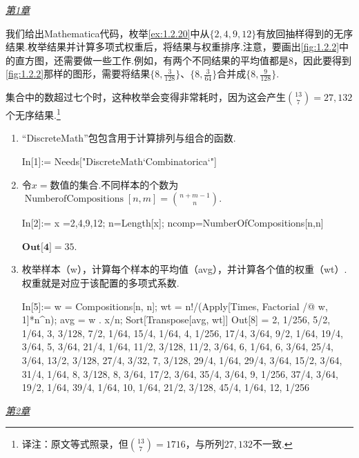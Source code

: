 \medskip\noindent\textit{\hyperref[sec:1]{第1章}}
\begin{example}[无序抽样]\label{ex:12.6.1}
我们给出Mathematica代码，枚举\autoref{ex:1.2.20}中从$\{2,4,9,12\}$有放回抽样得到的无序结果.枚举结果并计算多项式权重后，将结果与权重排序.注意，要画出\autoref{fig:1.2.2}中的直方图，还需要做一些工作.例如，有两个不同结果的平均值都是8，因此要得到\autoref{fig:1.2.2}那样的图形，需要将结果$\{8,\frac{3}{128}\}$、$\{8,\frac{3}{64}\}$合并成$\{8,\frac{9}{128}\}$.

集合中的数超过七个时，这种枚举会变得非常耗时，因为这会产生$\binom{13}{7}=27,132$个无序结果.\footnote{译注：原文等式照录，但$\binom{13}{7}=1716$，与所列$27,132$不一致.}
\begin{enumerate}[label=(\arabic*)]
\item “DiscreteMath”包包含用于计算排列与组合的函数.
\begin{sourcecode}
In[1]:= Needs["DiscreteMath`Combinatorica`"]
\end{sourcecode}
\item 令$x=$数值的集合.不同样本的个数为$\operatorname{NumberofCompositions}[n,m]=\binom{n+m-1}{n}$.
\begin{sourcecode}
In[2]:= x ={2,4,9,12};
n=Length[x];
ncomp=NumberOfCompositions[n,n]
\end{sourcecode}
\noindent$\textbf{Out[4]}=35$.
\item 枚举样本（w），计算每个样本的平均值（avg），并计算各个值的权重（wt）.权重就是对应于该配置的多项式系数.
\begin{sourcecode}
In[5]:= w = Compositions[n, n];
wt = n!/(Apply[Times, Factorial /@ w, 1]*n^n);
avg = w . x/n;
Sort[Transpose[{avg, wt}]]
Out[8] = {2, 1/256}, {5/2, 1/64}, {3, 3/128}, {7/2, 1/64}, {15/4, 1/64},
{4, 1/256}, {17/4, 3/64}, {9/2, 1/64}, {19/4, 3/64}, {5, 3/64},
{21/4, 1/64}, {11/2, 3/128}, {11/2, 3/64}, {6, 1/64}, {6, 3/64},
{25/4, 3/64}, {13/2, 3/128}, {27/4, 3/32}, {7, 3/128}, {29/4, 1/64},
{29/4, 3/64}, {15/2, 3/64}, {31/4, 1/64}, {8, 3/128}, {8, 3/64},
{17/2, 3/64}, {35/4, 3/64}, {9, 1/256}, {37/4, 3/64}, {19/2, 1/64},
{39/4, 1/64}, {10, 1/64}, {21/2, 3/128}, {45/4, 1/64}, {12, 1/256}
\end{sourcecode}
\end{enumerate}
\end{example}
\medskip\noindent\textit{\hyperref[sec:2]{第2章}}
